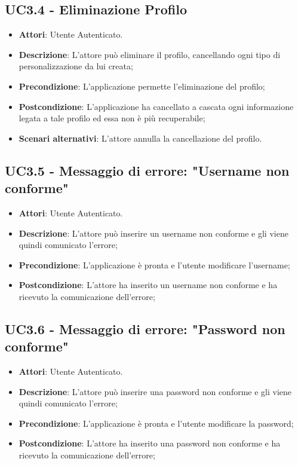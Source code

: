 \subsection{UC3.4 - Eliminazione Profilo} 
\label{ssec:UC3.4} 
\begin{itemize} 
\item \textbf{Attori}: Utente Autenticato.
\item \textbf{Descrizione}: L'attore può eliminare il profilo, cancellando ogni tipo di personalizzazione da lui creata;
\item \textbf{Precondizione}: L'applicazione permette l'eliminazione del profilo;
\item \textbf{Postcondizione}: L'applicazione ha cancellato a cascata ogni informazione legata a tale profilo ed essa non è più recuperabile;
\item \textbf{Scenari alternativi}: L'attore annulla la cancellazione del profilo.
\end{itemize} 
\subsection{UC3.5 - Messaggio di errore: "Username non conforme"} 
\label{ssec:UC3.5} 
\begin{itemize} 
\item \textbf{Attori}: Utente Autenticato.
\item \textbf{Descrizione}: L'attore può inserire un username non conforme e gli viene quindi comunicato l'errore;
\item \textbf{Precondizione}: L'applicazione è pronta e l'utente modificare l'username;
\item \textbf{Postcondizione}: L'attore ha inserito un username non conforme e ha ricevuto la comunicazione dell'errore;
\end{itemize} 
\subsection{UC3.6 - Messaggio di errore: "Password non conforme"} 
\label{ssec:UC3.6} 
\begin{itemize} 
\item \textbf{Attori}: Utente Autenticato.
\item \textbf{Descrizione}: L'attore può inserire una password non conforme e gli viene quindi comunicato l'errore;
\item \textbf{Precondizione}: L'applicazione è pronta e l'utente modificare la password;
\item \textbf{Postcondizione}: L'attore ha inserito una password non conforme e ha ricevuto la comunicazione dell'errore;
\end{itemize} 
